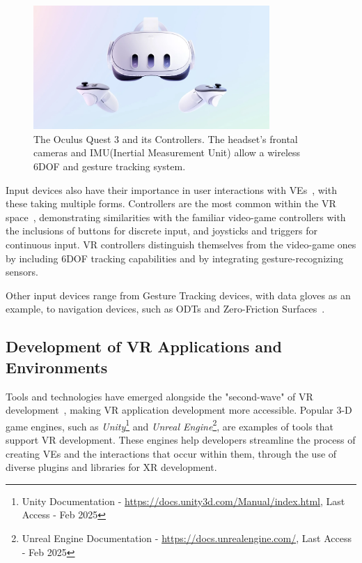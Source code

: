 \begin{figure}[b]
    \centering
    \includegraphics[width=0.8\textwidth]{NOVAthesisFiles/Images/papers/hmd-quest.png}
    \caption[Oculus Quest 3 and its Controllers]{The Oculus Quest 3 and its Controllers. The headset's frontal cameras and IMU(Inertial Measurement Unit) allow a wireless 
    \gls{6DOF} and gesture tracking system.}
    \label{fig:hmd-quest}
\end{figure}

Input devices also have their importance in user interactions with \glspl{VE}~\cite{Lee2020}, with these taking multiple forms.
Controllers are the most common within the \gls{VR} space~\cite{Anthes2016,Boletsis2022}, demonstrating similarities with the familiar 
video-game controllers with the inclusions of buttons for discrete input, and joysticks and triggers for continuous input. \gls{VR} controllers 
distinguish themselves from the video-game ones by including \gls{6DOF} tracking capabilities and by integrating gesture-recognizing sensors.

Other input devices range from Gesture Tracking devices, with data gloves as an example, to navigation devices, such as \glspl{ODT} 
and Zero-Friction Surfaces~\cite{Anthes2016,Nilsson2018}.

\subsection{Development of VR Applications and Environments}
\label{sec:vr-apps-environments}

Tools and technologies have emerged alongside the "second-wave" of \gls{VR} development~\cite{Anthes2016}, making \gls{VR} application development 
more accessible. Popular 3-D game engines, such as \textit{Unity}\footnote{Unity Documentation - \href{https://docs.unity3d.com/Manual/index.html}{https://docs.unity3d.com/Manual/index.html}, Last Access - Feb 2025} 
and \textit{Unreal Engine}\footnote{Unreal Engine Documentation - \href{https://docs.unrealengine.com/}{https://docs.unrealengine.com/}, Last Access - Feb 2025}, 
are examples of tools that support \gls{VR} development. These engines help developers streamline the process of creating \glspl{VE} and the interactions that occur 
within them, through the use of diverse plugins and libraries for XR development.

